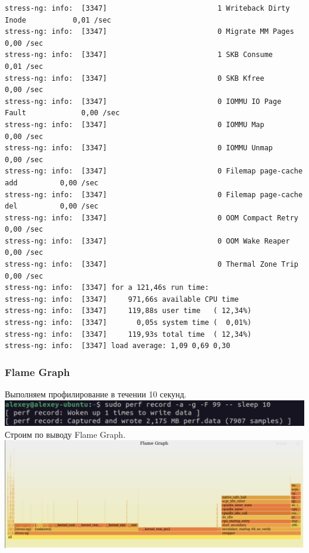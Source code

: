 {\begin{lstlisting}
stress-ng: info:  [3347]                          1 Writeback Dirty Inode           0,01 /sec 
stress-ng: info:  [3347]                          0 Migrate MM Pages                0,00 /sec 
stress-ng: info:  [3347]                          1 SKB Consume                     0,01 /sec 
stress-ng: info:  [3347]                          0 SKB Kfree                       0,00 /sec 
stress-ng: info:  [3347]                          0 IOMMU IO Page Fault             0,00 /sec 
stress-ng: info:  [3347]                          0 IOMMU Map                       0,00 /sec 
stress-ng: info:  [3347]                          0 IOMMU Unmap                     0,00 /sec 
stress-ng: info:  [3347]                          0 Filemap page-cache add          0,00 /sec 
stress-ng: info:  [3347]                          0 Filemap page-cache del          0,00 /sec 
stress-ng: info:  [3347]                          0 OOM Compact Retry               0,00 /sec 
stress-ng: info:  [3347]                          0 OOM Wake Reaper                 0,00 /sec 
stress-ng: info:  [3347]                          0 Thermal Zone Trip               0,00 /sec 
stress-ng: info:  [3347] for a 121,46s run time:
stress-ng: info:  [3347]     971,66s available CPU time
stress-ng: info:  [3347]     119,88s user time   ( 12,34%)
stress-ng: info:  [3347]       0,05s system time (  0,01%)
stress-ng: info:  [3347]     119,93s total time  ( 12,34%)
stress-ng: info:  [3347] load average: 1,09 0,69 0,30
\end{lstlisting}}
\subsubsection{Flame Graph}
Выполняем профилирование в течении 10 секунд.\\
\includegraphics[width=\textwidth]{image/perf.png}
Строим по выводу Flame Graph.\\
\includegraphics[width=\textwidth]{image/flamegraph.png}
